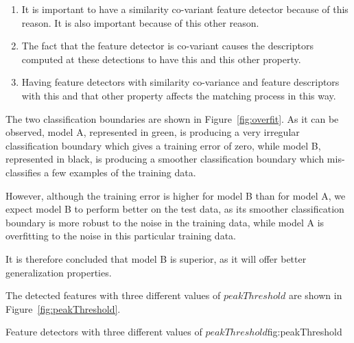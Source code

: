\documentclass{article}
\begin{document}
\maketitle


\begin{enumerate}
	\item It is important to have a similarity co-variant feature detector because of this reason. It is also important because of this other reason.
	\item The fact that the feature detector is co-variant causes the descriptors computed at these detections to have this and this other property.
	\item Having feature detectors with similarity co-variance and feature descriptors with this and that other property affects the matching process in this way.
\end{enumerate}


The two classification boundaries are shown in Figure~\ref{fig:overfit}. As it can be observed, model A, represented in green, is producing a very irregular classification boundary which gives a training error of zero, while model B, represented in black, is producing a smoother classification boundary which mis-classifies a few examples of the training data.

However, although the training error is higher for model B than for model A, we expect model B to perform better on the test data, as its smoother classification boundary is more robust to the noise in the training data, while model A is overfitting to the noise in this particular training data.

It is therefore concluded that model B is superior, as it will offer better generalization properties.



The detected features with three different values of $peakThreshold$ are shown in Figure~\ref{fig:peakThreshold}. %

{}
{}
{Feature detectors with three different values of $peakThreshold$}{fig:peakThreshold}
\end{document}
